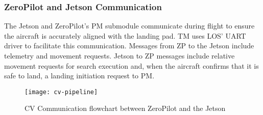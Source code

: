 \subsubsection{ZeroPilot and Jetson Communication}
\label{sec:zp-jetson-communication}

The Jetson and ZeroPilot's PM submodule communicate during flight to ensure the
aircraft is accurately aligned with the landing pad. TM uses LOS' UART driver
to facilitate this communication. Messages from ZP to the Jetson include
telemetry and movement requests. Jetson to ZP messages include relative
movement requests for search execution and, when the aircraft confirms that it
is safe to land, a landing initiation request to PM.

\begin{figure}[H]
        \centering
        \texttt{[image: cv-pipeline]}
		\caption{CV Communication flowchart between ZeroPilot and the Jetson}
\end{figure}
